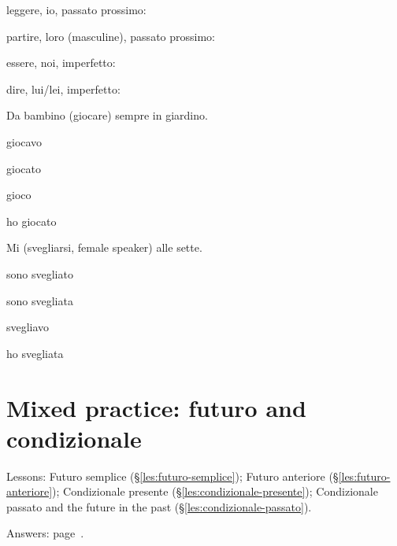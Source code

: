 \documentclass[11pt,a4paper,twoside,openright]{book}
\newcommand{\blank}{\underline{\hspace{2.6cm}}}
\begin{document}
\begin{exercises}
\item\label{ex:mix-past-1}\relax leggere, io, passato prossimo: \blank{}
\item\label{ex:mix-past-2}\relax partire, loro (masculine), passato prossimo: \blank{}
\item\label{ex:mix-past-3}\relax essere, noi, imperfetto: \blank{}
\item\label{ex:mix-past-4}\relax dire, lui/lei, imperfetto: \blank{}
\item\label{ex:mix-past-5}\relax Da bambino \blank{} (giocare) sempre in giardino.\par\nopagebreak\begin{options}
\item\relax giocavo
\item\relax giocato
\item\relax gioco
\item\relax ho giocato
\end{options}
\item\label{ex:mix-past-6}\relax Mi \blank{} (svegliarsi, female speaker) alle sette.\par\nopagebreak\begin{options}
\item\relax sono svegliato
\item\relax sono svegliata
\item\relax svegliavo
\item\relax ho svegliata
\end{options}
\end{exercises}

\section{Mixed practice: futuro and condizionale}\label{set:mixed-future-conditional}
{\small Lessons: Futuro semplice (\S\ref{les:futuro-semplice}); Futuro anteriore (\S\ref{les:futuro-anteriore}); Condizionale presente (\S\ref{les:condizionale-presente}); Condizionale passato and the future in the past (\S\ref{les:condizionale-passato}).}\par
{\color{muted}\small Answers: page~\pageref{ans:set:mixed-future-conditional}.}
\end{document}
